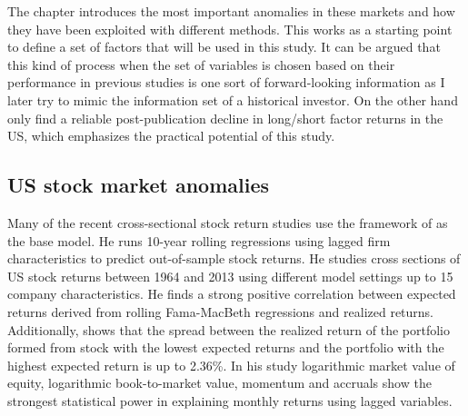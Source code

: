 \documentclass[12pt]{article}
\begin{document}
The chapter introduces the most important anomalies in these markets and how they have been exploited with different methods. This works as a starting point to define a set of factors that will be used in this study. It can be argued that this kind of process when the set of variables is chosen based on their performance in previous studies is one sort of forward-looking information as I later try to mimic the information set of a historical investor. On the other hand \citet{JACOBS2020213} only find a reliable post-publication decline in long/short factor returns in the US, which emphasizes the practical potential of this study. \footnotemark {}  \par

\subsection{US stock market anomalies}\label{USStockMarketAnomalies}

Many of the recent cross-sectional stock return studies use the framework of \citet{Lewellen2015} as the base model. He runs 10-year rolling \citet{FamaMacBeth1973} regressions using lagged firm characteristics to predict out-of-sample stock returns. He studies cross sections of US stock returns between 1964 and 2013 using different model settings up to 15 company characteristics.\footnotemark {} He finds a strong positive correlation between expected returns derived from rolling Fama-MacBeth regressions and realized returns. Additionally, \citeauthor{Lewellen2015} shows that the spread between the realized return of the portfolio formed from stock with the lowest expected returns and the portfolio with the highest expected return is up to 2.36\%. In his study logarithmic market value of equity, logarithmic book-to-market value, momentum and accruals show the strongest statistical power in explaining monthly returns using lagged variables.\footnotemark {} \par
\end{document}
